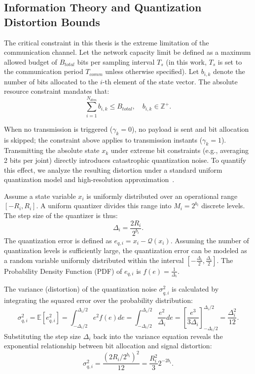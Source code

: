 \subsection{Information Theory and Quantization Distortion Bounds}

The critical constraint in this thesis is the extreme limitation of the communication channel. Let the network capacity limit be defined as a maximum allowed budget of $B_{total}$ bits per sampling interval $T_s$ (in this work, $T_s$ is set to the communication period $T_{comm}$ unless otherwise specified). Let $b_{i,k}$ denote the number of bits allocated to the $i$-th element of the state vector. The absolute resource constraint mandates that:
\begin{equation}
    \sum_{i=1}^{N_{dim}} b_{i,k} \le B_{total}, \quad b_{i,k} \in \mathbb{Z}^+ .
\end{equation}

When no transmission is triggered ($\gamma_k=0$), no payload is sent and bit allocation is skipped; the constraint above applies to transmission instants ($\gamma_k=1$). Transmitting the absolute state $x_k$ under extreme bit constraints (e.g., averaging 2 bits per joint) directly introduces catastrophic quantization noise. To quantify this effect, we analyze the resulting distortion under a standard uniform quantization model and high-resolution approximation~\cite{FCUDRC,CONFRC}.

Assume a state variable $x_i$ is uniformly distributed over an operational range $[-R_i, R_i]$. A uniform quantizer divides this range into $M_i = 2^{b_i}$ discrete levels. The step size of the quantizer is thus:
\begin{equation}
    \Delta_i = \frac{2R_i}{2^{b_i}}.
\end{equation}
The quantization error is defined as $e_{q,i} = x_i - \mathcal{Q}(x_i)$. Assuming the number of quantization levels is sufficiently large, the quantization error can be modeled as a random variable uniformly distributed within the interval $[-\frac{\Delta_i}{2}, \frac{\Delta_i}{2}]$. The Probability Density Function (PDF) of $e_{q,i}$ is $f(e) = \frac{1}{\Delta_i}$.

The variance (distortion) of the quantization noise $\sigma_{q,i}^2$ is calculated by integrating the squared error over the probability distribution:
\begin{equation}
    \sigma_{q,i}^2 = \mathbb{E}[e_{q,i}^2] = \int_{-\Delta_i/2}^{\Delta_i/2} e^2 f(e) de = \int_{-\Delta_i/2}^{\Delta_i/2} \frac{e^2}{\Delta_i} de = \left[ \frac{e^3}{3\Delta_i} \right]_{-\Delta_i/2}^{\Delta_i/2} = \frac{\Delta_i^2}{12}.
\end{equation}
Substituting the step size $\Delta_i$ back into the variance equation reveals the exponential relationship between bit allocation and signal distortion:
\begin{equation}
    \sigma_{q,i}^2 = \frac{(2R_i/2^{b_i})^2}{12} = \frac{R_i^2}{3} 2^{-2b_i}.
\end{equation}


